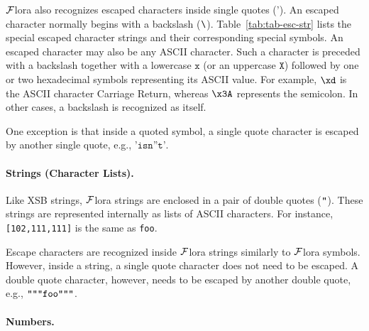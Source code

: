 \documentclass[11pt]{article}
\newcommand{\FLORA}{{\mbox{${\cal F}${\sc lora}}}\xspace}
\newcommand{\bksl}{\symbol{92}}
\newcommand{\dq}{\symbol{34}}
\begin{document}
\FLORA also recognizes escaped characters inside single quotes
($\texttt{'}$).  An escaped character normally begins with a backslash
($\texttt{\bksl}$).  Table~\ref{tab:tab-esc-str} lists the special escaped
character strings and their corresponding special symbols. An escaped
character may also be any ASCII character. Such a character is preceded
with a backslash together with a lowercase $\texttt{x}$ (or an uppercase
$\texttt{X}$) followed by one or two hexadecimal symbols representing its
ASCII value. For example, $\texttt{{\bksl}xd}$ is the ASCII character
Carriage Return, whereas $\texttt{{\bksl}x3A}$ represents the semicolon. In
other cases, a backslash is recognized as itself.

One exception is that inside a quoted symbol, a single quote character is
escaped by another single quote, e.g., $\texttt{'isn''t'}$.

\paragraph{Strings (Character Lists).}

Like XSB strings, \FLORA strings are enclosed in a pair of double quotes
($\texttt{{\dq}}$).  These strings are represented internally as lists of
ASCII characters. For instance, \mbox{\texttt{[102,111,111]}} is the same
as \texttt{{\dq}foo{\dq}}.

Escape characters are recognized inside \FLORA strings similarly to
\FLORA symbols.  However, inside a string, a single quote character does
not need to be escaped. A double quote character, however, needs to be
escaped by another double quote, e.g.,
$\texttt{{\dq}{\dq}{\dq}foo{\dq}{\dq}{\dq}}$.

\paragraph{Numbers.}
\end{document}
